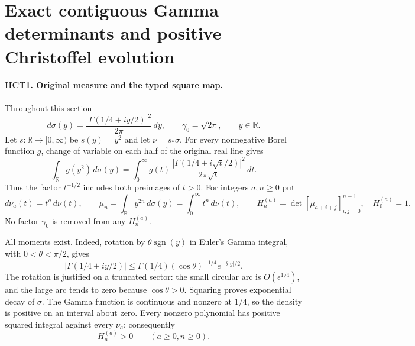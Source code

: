 \section{Exact contiguous Gamma determinants and positive Christoffel evolution}
\label{sec:HCT}

\paragraph{HCT1. Original measure and the typed square map.}
Throughout this section
\[
 d\sigma(y)=\frac{|\Gamma(1/4+iy/2)|^2}{2\pi}\,dy,
 \qquad \gamma_0=\sqrt{2\pi},\qquad y\in\mathbb R.
\]
Let $s:\mathbb R\longrightarrow[0,\infty)$ be $s(y)=y^2$ and
let $\nu=s_*\sigma$. For every nonnegative Borel function $g$,
change of variable on each half of the original real line gives
\begin{equation}\tag{HCT1}
 \int_{\mathbb R}g(y^2)\,d\sigma(y)
 =\int_0^\infty g(t)\,
 \frac{|\Gamma(1/4+i\sqrt t/2)|^2}{2\pi\sqrt t}\,dt.
\end{equation}
Thus the factor $t^{-1/2}$ includes both preimages of $t>0$.
For integers $a,n\geq0$ put
\[
 d\nu_a(t)=t^a\,d\nu(t),\qquad
 \mu_n=\int_{\mathbb R}y^{2n}\,d\sigma(y)=\int_0^\infty t^n\,d\nu(t),
 \qquad H_n^{(a)}=\det[\mu_{a+i+j}]_{i,j=0}^{n-1},\quad H_0^{(a)}=1.
\]
No factor $\gamma_0$ is removed from any $H_n^{(a)}$.

All moments exist. Indeed, rotation by $\theta\operatorname{sgn}(y)$
in Euler's Gamma integral, with $0<\theta<\pi/2$, gives
\[
 |\Gamma(1/4+iy/2)|
 \leq \Gamma(1/4)(\cos\theta)^{-1/4}e^{-\theta|y|/2}.
\]
The rotation is justified on a truncated sector: the small circular
arc is $O(\epsilon^{1/4})$, and the large arc tends to zero because
$\cos\theta>0$. Squaring proves exponential decay of $\sigma$.
The Gamma function is continuous and nonzero at $1/4$, so the density
is positive on an interval about zero. Every nonzero polynomial has
positive squared integral against every $\nu_a$; consequently
\begin{equation}\tag{HCT2}
 H_n^{(a)}>0\qquad(a\geq0, n\geq0).
\end{equation}

